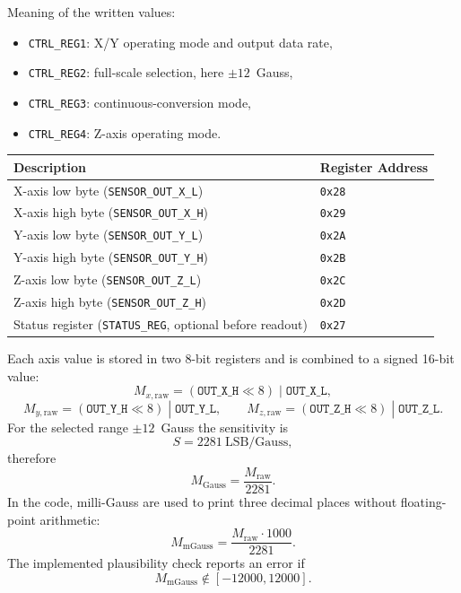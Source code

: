 Meaning of the written values:
\begin{itemize}
	\item \texttt{CTRL\_REG1}: X/Y operating mode and output data rate,
	\item \texttt{CTRL\_REG2}: full-scale selection, here $\pm 12$~Gauss,
	\item \texttt{CTRL\_REG3}: continuous-conversion mode,
	\item \texttt{CTRL\_REG4}: Z-axis operating mode.
\end{itemize}

\begin{table}[H]
	\centering
	\begin{tabularx}{0.85\textwidth}{|>{\raggedright\arraybackslash}X|>{\raggedright\arraybackslash}X|}
		\hline
		\textbf{Description}                                            & \textbf{Register Address} \\ \hline
		X-axis low byte (\texttt{SENSOR\_OUT\_X\_L})                    & \texttt{0x28}             \\ \hline
		X-axis high byte (\texttt{SENSOR\_OUT\_X\_H})                   & \texttt{0x29}             \\ \hline
		Y-axis low byte (\texttt{SENSOR\_OUT\_Y\_L})                    & \texttt{0x2A}             \\ \hline
		Y-axis high byte (\texttt{SENSOR\_OUT\_Y\_H})                   & \texttt{0x2B}             \\ \hline
		Z-axis low byte (\texttt{SENSOR\_OUT\_Z\_L})                    & \texttt{0x2C}             \\ \hline
		Z-axis high byte (\texttt{SENSOR\_OUT\_Z\_H})                   & \texttt{0x2D}             \\ \hline
		Status register (\texttt{STATUS\_REG}, optional before readout) & \texttt{0x27}             \\ \hline
	\end{tabularx}
\end{table}

Each axis value is stored in two 8-bit registers and is combined to a signed 16-bit value:
\[
	M_{x,\mathrm{raw}} = (\texttt{OUT\_X\_H} \ll 8) \; | \; \texttt{OUT\_X\_L},
\]
\[
	M_{y,\mathrm{raw}} = (\texttt{OUT\_Y\_H} \ll 8) \; | \; \texttt{OUT\_Y\_L}, \qquad
	M_{z,\mathrm{raw}} = (\texttt{OUT\_Z\_H} \ll 8) \; | \; \texttt{OUT\_Z\_L}.
\]
For the selected range $\pm 12$~Gauss the sensitivity is
\[
	S = 2281~\mathrm{LSB/Gauss},
\]
therefore
\[
	M_{\mathrm{Gauss}} = \frac{M_{\mathrm{raw}}}{2281}.
\]
In the code, milli-Gauss are used to print three decimal places without floating-point arithmetic:
\[
	M_{\mathrm{mGauss}} = \frac{M_{\mathrm{raw}} \cdot 1000}{2281}.
\]
The implemented plausibility check reports an error if
\[
	M_{\mathrm{mGauss}} \notin [-12000,12000].
\]

